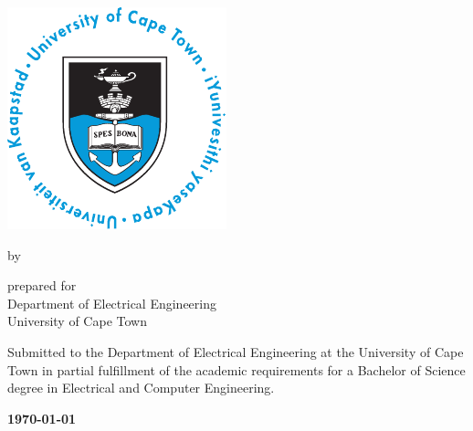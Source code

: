 \begin{titlepage}
  \null\vfill
  {\centering\LARGE\bfseries\thetitle\par}
  \vfill
  \vskip 10mm
  {\centering\includegraphics[scale=1.1]{figures/logo}\par}
  \vfill
  \begin{center}by \textsc{\theauthor}\end{center}
  \vfill
  {\centering prepared for \textsc{\thesupervisor}\\ Department of Electrical Engineering\\ University of Cape Town\par}
  \vfill
  \noindent
  Submitted to the Department of Electrical Engineering at the University of Cape Town in partial fulfillment of the academic requirements for a Bachelor of Science degree in Electrical and Computer Engineering.
  \vfill
  \begin{center}\bfseries\today\end{center}
\end{titlepage}
